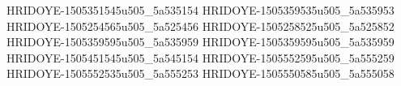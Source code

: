 HRIDOYE-1505351545u505_5a535154
HRIDOYE-1505359535u505_5a535953
HRIDOYE-1505254565u505_5a525456
HRIDOYE-1505258525u505_5a525852
HRIDOYE-1505359595u505_5a535959
HRIDOYE-1505359595u505_5a535959
HRIDOYE-1505451545u505_5a545154
HRIDOYE-1505552595u505_5a555259
HRIDOYE-1505552535u505_5a555253
HRIDOYE-1505550585u505_5a555058

